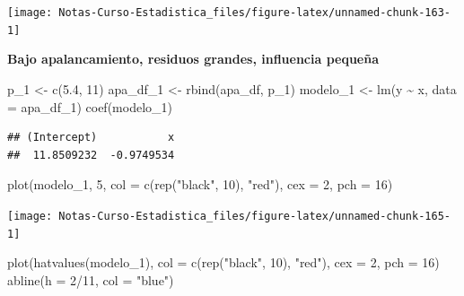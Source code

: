 \documentclass[
  12pt,
]{book}
\newenvironment{Shaded}{\begin{snugshade}}{\end{snugshade}}
\newcommand{\AttributeTok}[1]{\textcolor[rgb]{0.77,0.63,0.00}{#1}}
\newcommand{\DecValTok}[1]{\textcolor[rgb]{0.00,0.00,0.81}{#1}}
\newcommand{\FloatTok}[1]{\textcolor[rgb]{0.00,0.00,0.81}{#1}}
\newcommand{\FunctionTok}[1]{\textcolor[rgb]{0.00,0.00,0.00}{#1}}
\newcommand{\NormalTok}[1]{#1}
\newcommand{\OtherTok}[1]{\textcolor[rgb]{0.56,0.35,0.01}{#1}}
\newcommand{\SpecialCharTok}[1]{\textcolor[rgb]{0.00,0.00,0.00}{#1}}
\newcommand{\StringTok}[1]{\textcolor[rgb]{0.31,0.60,0.02}{#1}}
\begin{document}
\begin{center}\texttt{[image: Notas-Curso-Estadistica\_files/figure-latex/unnamed-chunk-163-1]} \end{center}

\textbf{Bajo apalancamiento, residuos grandes, influencia pequeña}

\begin{Shaded}
\begin{Highlighting}[]
\NormalTok{p\_1 }\OtherTok{\textless{}{-}} \FunctionTok{c}\NormalTok{(}\FloatTok{5.4}\NormalTok{, }\DecValTok{11}\NormalTok{)}
\NormalTok{apa\_df\_1 }\OtherTok{\textless{}{-}} \FunctionTok{rbind}\NormalTok{(apa\_df, p\_1)}
\NormalTok{modelo\_1 }\OtherTok{\textless{}{-}} \FunctionTok{lm}\NormalTok{(y }\SpecialCharTok{\textasciitilde{}}\NormalTok{ x, }\AttributeTok{data =}\NormalTok{ apa\_df\_1)}
\FunctionTok{coef}\NormalTok{(modelo\_1)}
\end{Highlighting}
\end{Shaded}

\begin{verbatim}
## (Intercept)           x 
##  11.8509232  -0.9749534
\end{verbatim}

\begin{Shaded}
\begin{Highlighting}[]
\FunctionTok{plot}\NormalTok{(modelo\_1, }\DecValTok{5}\NormalTok{, }\AttributeTok{col =} \FunctionTok{c}\NormalTok{(}\FunctionTok{rep}\NormalTok{(}\StringTok{"black"}\NormalTok{, }\DecValTok{10}\NormalTok{), }\StringTok{"red"}\NormalTok{),}
    \AttributeTok{cex =} \DecValTok{2}\NormalTok{, }\AttributeTok{pch =} \DecValTok{16}\NormalTok{)}
\end{Highlighting}
\end{Shaded}

\begin{center}\texttt{[image: Notas-Curso-Estadistica\_files/figure-latex/unnamed-chunk-165-1]} \end{center}

\begin{Shaded}
\begin{Highlighting}[]
\FunctionTok{plot}\NormalTok{(}\FunctionTok{hatvalues}\NormalTok{(modelo\_1), }\AttributeTok{col =} \FunctionTok{c}\NormalTok{(}\FunctionTok{rep}\NormalTok{(}\StringTok{"black"}\NormalTok{, }\DecValTok{10}\NormalTok{),}
    \StringTok{"red"}\NormalTok{), }\AttributeTok{cex =} \DecValTok{2}\NormalTok{, }\AttributeTok{pch =} \DecValTok{16}\NormalTok{)}
\FunctionTok{abline}\NormalTok{(}\AttributeTok{h =} \DecValTok{2}\SpecialCharTok{/}\DecValTok{11}\NormalTok{, }\AttributeTok{col =} \StringTok{"blue"}\NormalTok{)}
\end{Highlighting}
\end{Shaded}
\end{document}
